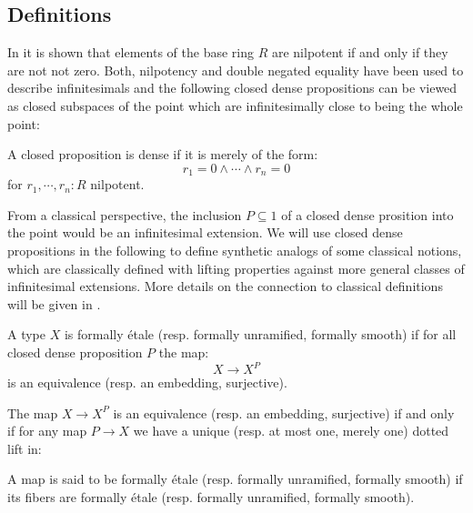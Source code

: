 \subsection{Definitions}

In \cite{draft} it is shown that elements of the base ring $R$ are nilpotent if and only if they are not not zero.
Both, nilpotency and double negated equality have been used to describe infinitesimals and the following closed dense propositions can be viewed as closed subspaces of the point which are infinitesimally close to being the whole point:

\begin{definition}
A closed proposition is dense if it is merely of the form:
\[r_1=0\land\cdots\land r_n=0\]
for $r_1,\cdots,r_n:R$ nilpotent.
\end{definition}

From a classical perspective, the inclusion $P\subseteq 1$ of a closed dense prosition into the point would be an infinitesimal extension.
We will use closed dense propositions in the following to define synthetic analogs of some classical notions, which are classically defined with lifting properties against more general classes of infinitesimal extensions.
More details on the connection to classical definitions will be given in .

\begin{definition}
  \label{def-etale-closed-dense}
A type $X$ is formally étale (resp. formally unramified, formally smooth) if for all closed dense proposition $P$ the map:
\[X\to X^P\]
is an equivalence (resp. an embedding, surjective).
\end{definition}

\begin{remark}
The map $X\to X^P$ is an equivalence (resp. an embedding, surjective) if and only if for any map $P\to X$ we have a unique (resp. at most one, merely one) dotted lift in:
\begin{center}
\end{center}
\end{remark}

\begin{definition}
A map is said to be formally étale (resp. formally unramified, formally smooth) if its fibers are formally étale (resp. formally unramified, formally smooth).
\end{definition}

